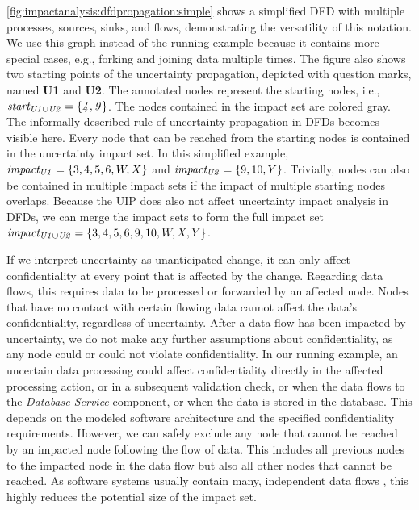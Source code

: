 \autoref{fig:impactanalysis:dfdpropagation:simple} shows a simplified \ac{DFD} with multiple processes, sources, sinks, and flows, demonstrating the versatility of this notation.
We use this graph instead of the running example because it contains more special cases, e.g., forking and joining data multiple times.
The figure also shows two starting points of the uncertainty propagation, depicted with question marks, named \textbf{U1} and \textbf{U2}.
The annotated nodes represent the starting nodes, i.e., $\mathit{start_{U1 \cup U2}} = \{ \mathit{4,9} \}$.
The nodes contained in the impact set are colored gray.
The informally described rule of uncertainty propagation in \acp{DFD} becomes visible here.
Every node that can be reached from the starting nodes is contained in the uncertainty impact set.
In this simplified example, $\mathit{impact_{U1}} = \{ 3,4,5,6,W,X \}$ and $\mathit{impact_{U2}} = \{ 9,10,Y \}$.
Trivially, nodes can also be contained in multiple impact sets if the impact of multiple starting nodes overlaps.
Because the \ac{UIP} does also not affect uncertainty impact analysis in \acp{DFD}, we can merge the impact sets to form the full impact set $\mathit{impact_{U1 \cup U2}} = \{ 3,4,5,6,9,10,W,X,Y \}$.

If we interpret uncertainty as unanticipated change, it can only affect confidentiality at every point that is affected by the change.
Regarding data flows, this requires data to be processed or forwarded by an affected node.
Nodes that have no contact with certain flowing data cannot affect the data's confidentiality, regardless of uncertainty. 
After a data flow has been impacted by uncertainty, we do not make any further assumptions about confidentiality, as any node could or could not violate confidentiality.
In our running example, an uncertain data processing could affect confidentiality directly in the affected processing action, or in a subsequent validation check, or when the data flows to the \emph{Database Service} component, or when the data is stored in the database.
This depends on the modeled software architecture and the specified confidentiality requirements.
However, we can safely exclude any node that cannot be reached by an impacted node following the flow of data.
This includes all previous nodes to the impacted node in the data flow but also all other nodes that cannot be reached.
As software systems usually contain many, independent data flows \cite{seifermann_architectural_2022}, this highly reduces the potential size of the impact set.



